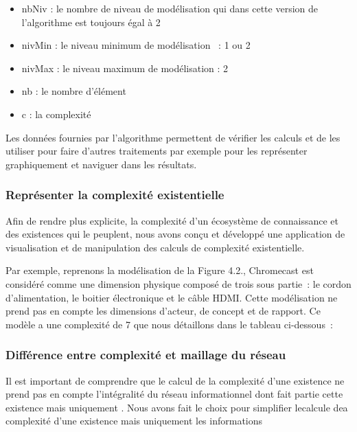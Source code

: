 \documentclass[
  a4paper,
  DIV=11,
  numbers=noendperiod]{scrreprt}
\providecommand{\tightlist}{%
  \setlength{\itemsep}{0pt}\setlength{\parskip}{0pt}}\usepackage{longtable,booktabs,array}
\begin{document}
\begin{itemize}
  \begin{itemize}
  \tightlist
  \item
    nbNiv : le nombre de niveau de modélisation qui dans cette version
    de l'algorithme est toujours égal à 2
  \item
    nivMin : le niveau minimum de modélisation ~: 1 ou 2
  \item
    nivMax : le niveau maximum de modélisation : 2
  \item
    nb : le nombre d'élément
  \item
    c : la complexité
  \end{itemize}
\end{itemize}

Les données fournies par l'algorithme permettent de vérifier les calculs
et de les utiliser pour faire d'autres traitements par exemple pour les
représenter graphiquement et naviguer dans les résultats.

\subsubsection{Représenter la complexité
existentielle}\label{repruxe9senter-la-complexituxe9-existentielle}

Afin de rendre plus explicite, la complexité d'un écosystème de
connaissance et des existences qui le peuplent, nous avons conçu et
développé une application de visualisation et de manipulation des
calculs de complexité existentielle.

Par exemple, reprenons la modélisation de la Figure 4.2., Chromecast est
considéré comme une dimension physique composé de trois sous partie~: le
cordon d'alimentation, le boitier électronique et le câble HDMI. Cette
modélisation ne prend pas en compte les dimensions d'acteur, de concept
et de rapport. Ce modèle a une complexité de 7 que nous détaillons dans
le tableau ci-dessous~:

\subsubsection{Différence entre complexité et maillage du
réseau}\label{diffuxe9rence-entre-complexituxe9-et-maillage-du-ruxe9seau}

Il est important de comprendre que le calcul de la complexité d'une
existence ne prend pas en compte l'intégralité du réseau informationnel
dont fait partie cette existence mais uniquement . Nous avons fait le
choix pour simplifier lecalcule dea complexité d'une existence mais
uniquement les informations
\end{document}
